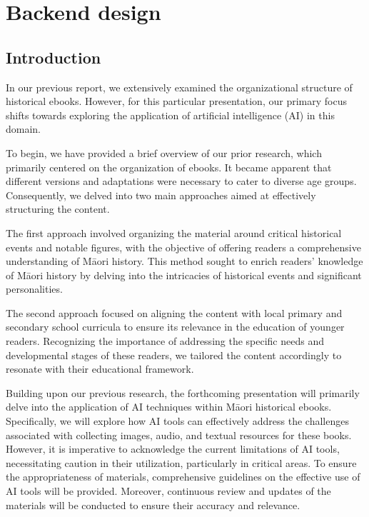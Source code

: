 \chapter{Backend design} 

\section*{Introduction}

In our previous report, we extensively examined the organizational structure of historical ebooks. 
However, for this particular presentation, our primary focus shifts towards exploring the application of artificial intelligence (AI) in this domain.

To begin, we have provided a brief overview of our prior research, which primarily centered on the organization of ebooks. 
It became apparent that different versions and adaptations were necessary to cater to diverse age groups. 
Consequently, we delved into two main approaches aimed at effectively structuring the content.

The first approach involved organizing the material around critical historical events and notable figures, with the objective of offering readers a comprehensive understanding of Māori history. 
This method sought to enrich readers' knowledge of Māori history by delving into the intricacies of historical events and significant personalities.

The second approach focused on aligning the content with local primary and secondary school curricula to ensure its relevance in the education of younger readers. 
Recognizing the importance of addressing the specific needs and developmental stages of these readers, we tailored the content accordingly to resonate with their educational framework.

Building upon our previous research, the forthcoming presentation will primarily delve into the application of AI techniques within Māori historical ebooks. 
Specifically, we will explore how AI tools can effectively address the challenges associated with collecting images, audio, and textual resources for these books. 
However, it is imperative to acknowledge the current limitations of AI tools, necessitating caution in their utilization, particularly in critical areas. 
To ensure the appropriateness of materials, comprehensive guidelines on the effective use of AI tools will be provided. 
Moreover, continuous review and updates of the materials will be conducted to ensure their accuracy and relevance.


